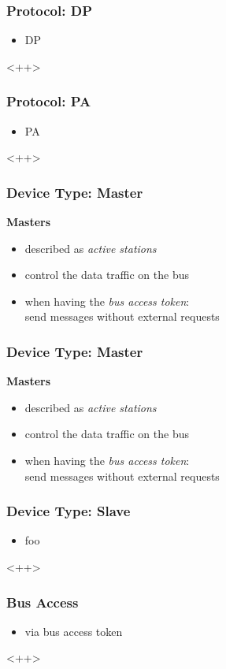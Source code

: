 \documentclass{beamer}
\begin{document}
\begin{frame}
  \frametitle{Protocol: DP}
  \begin{itemize}
    \item DP
  \end{itemize}<++>
\end{frame}

\begin{frame}
  \frametitle{Protocol: PA}
  \begin{itemize}
    \item PA
  \end{itemize}<++>
\end{frame}

\begin{frame}
  \frametitle{Device Type: Master}
  \textbf{Masters}
  \begin{itemize}
    \item described as \textit{active stations}
    \item control the data traffic on the bus
    \item when having the \textit{bus access token}:\\
      send messages without external requests
  \end{itemize}
\end{frame}

\begin{frame}
  \frametitle{Device Type: Master}
  \textbf{Masters}
  \begin{itemize}
    \item described as \textit{active stations}
    \item control the data traffic on the bus
    \item when having the \textit{bus access token}:\\
      send messages without external requests
  \end{itemize}
\end{frame}

\begin{frame}
  \frametitle{Device Type: Slave}
  \begin{itemize}
    \item foo
  \end{itemize}<++>
\end{frame}

\begin{frame}
  \frametitle{Bus Access}
  \begin{itemize}
    \item via bus access token
  \end{itemize}<++>
\end{frame}
\end{document}
